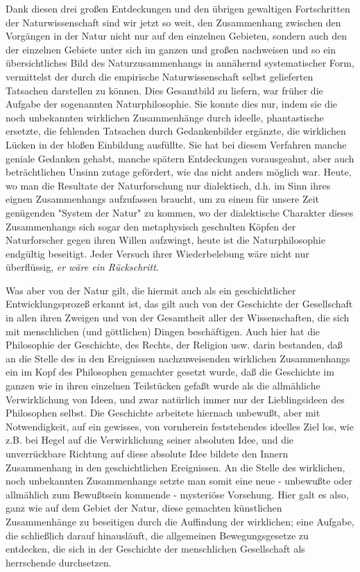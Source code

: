 Dank diesen drei großen Entdeckungen und den übrigen gewaltigen
Fortschritten der Naturwissenschaft sind wir jetzt so weit, den
Zusammenhang zwischen den Vorgängen in der Natur nicht nur auf den
einzelnen Gebieten, sondern auch den der einzelnen Gebiete unter sich im
ganzen und großen nachweisen und so ein übersichtliches Bild des
Naturzusammenhangs in annähernd systematischer Form, vermittelst der
durch die empirische Naturwissenschaft selbst gelieferten Tatsachen
darstellen zu können. Dies Gesamtbild zu liefern, war früher die Aufgabe
der sogenannten Naturphilosophie. Sie konnte dies nur, indem sie die
noch unbekannten wirklichen Zusammenhänge durch ideelle, phantastische
ersetzte, die fehlenden Tatsachen durch Gedankenbilder ergänzte, die
wirklichen Lücken in der bloßen Einbildung ausfüllte. Sie hat bei diesem
Verfahren manche geniale Gedanken gehabt, manche spätern Entdeckungen
vorausgeahnt, aber auch beträchtlichen Unsinn zutage gefördert, wie das
nicht anders möglich war. Heute, wo man die Resultate der Naturforschung
nur dialektisch, d.h. im Sinn ihres eignen Zusammenhangs aufzufassen
braucht, um zu einem für unsere Zeit genügenden "System der Natur" zu
kommen, wo der dialektische Charakter dieses Zusammenhangs sich sogar
den metaphysisch geschulten Köpfen der Naturforscher gegen ihren Willen
aufzwingt, heute ist die Naturphilosophie endgültig beseitigt. Jeder
Versuch ihrer Wiederbelebung wäre nicht nur überflüssig, \emph{er wäre
ein Rückschritt}.

Was aber von der Natur gilt, die hiermit auch als ein
geschichtlicher Entwicklungsprozeß
erkannt ist, das gilt auch von der Geschichte der Gesellschaft in allen
ihren Zweigen und von der Gesamtheit aller der Wissenschaften, die sich
mit menschlichen (und göttlichen) Dingen beschäftigen. Auch hier hat die
Philosophie der Geschichte, des Rechts, der Religion usw. darin
bestanden, daß an die Stelle des in den Ereignissen nachzuweisenden
wirklichen Zusammenhangs ein im Kopf des Philosophen gemachter gesetzt
wurde, daß die Geschichte im ganzen wie in ihren einzelnen Teilstücken
gefaßt wurde als die allmähliche Verwirklichung von Ideen, und zwar
natürlich immer nur der Lieblingsideen des Philosophen selbst. Die
Geschichte arbeitete hiernach unbewußt, aber mit Notwendigkeit, auf ein
gewisses, von vornherein feststehendes ideelles Ziel los, wie z.B. bei
Hegel auf die Verwirklichung seiner absoluten Idee, und die
unverrückbare Richtung auf diese absolute Idee bildete den Innern
Zusammenhang in den geschichtlichen Ereignissen. An die Stelle des
wirklichen, noch unbekannten Zusammenhangs setzte man somit eine neue -
unbewußte oder allmählich zum Bewußtsein kommende - mysteriöse
Vorsehung. Hier galt es also, ganz wie auf dem Gebiet der Natur, diese
gemachten künstlichen Zusammenhänge zu beseitigen durch die Auffindung
der wirklichen; eine Aufgabe, die schließlich darauf hinausläuft, die
allgemeinen Bewegungsgesetze zu entdecken, die sich in der Geschichte
der menschlichen Gesellschaft als herrschende durchsetzen.

